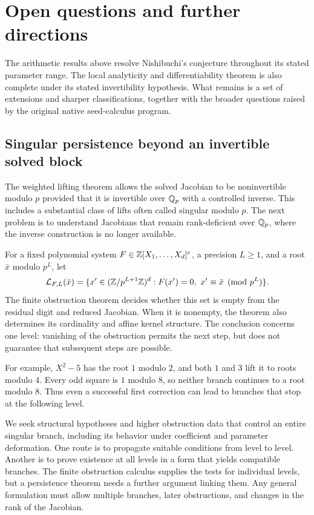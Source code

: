 \section{Open questions and further directions}
\label{sec:open}

The arithmetic results above resolve Nishibuchi's conjecture throughout its
stated parameter range. The local analyticity and differentiability theorem
is also complete under its stated invertibility hypothesis. What remains is
a set of extensions and sharper classifications, together with the broader
questions raised by the original native seed-calculus program.

\subsection{Singular persistence beyond an invertible solved block}
\label{subsec:singular-open}

The weighted lifting theorem allows the solved Jacobian to be noninvertible
modulo $p$ provided that it is invertible over $\mathbb Q_p$ with a controlled inverse.
This includes a substantial class of lifts often called singular modulo $p$.
The next problem is to understand Jacobians that remain rank-deficient over
$\mathbb Q_p$, where the inverse construction is no longer available.

For a fixed polynomial system $F\in\mathbb Z[X_1,\ldots,X_d]^e$, a precision $L\geq1$,
and a root $\bar x$ modulo $p^L$, let
\[
\mathcal L_{F,L}(\bar x)
=\{x'\in(\mathbb Z/p^{L+1}\mathbb Z)^d:
F(x')=0,\ x'\equiv\bar x\pmod{p^L}\}.
\]
The finite obstruction theorem decides whether this set is empty from the
residual digit and reduced Jacobian. When it is nonempty, the theorem also
determines its cardinality and affine kernel structure. The conclusion
concerns one level: vanishing of the obstruction permits the next step,
but does not guarantee that subsequent steps are possible.

For example, $X^2-5$ has the root $1$ modulo $2$, and both $1$ and $3$ lift it
to roots modulo $4$. Every odd square is $1$ modulo $8$, so neither branch
continues to a root modulo $8$. Thus even a successful first correction can
lead to branches that stop at the following level.

We seek structural hypotheses and higher obstruction data that control an
entire singular branch, including its behavior under coefficient and parameter
deformation. One route is to propagate suitable conditions from level to
level. Another is to prove existence at all levels in a form that yields
compatible branches. The finite obstruction calculus supplies the tests for
individual levels, but a persistence theorem needs a further argument linking
them. Any general formulation must allow multiple branches, later
obstructions, and changes in the rank of the Jacobian.

